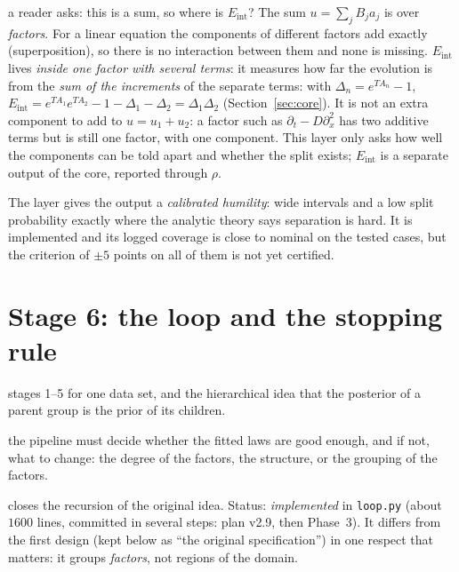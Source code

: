 \documentclass[11pt,a4paper]{article}
\theoremstyle{definition}
\newcommand{\sectionbrief}[3]{\begin{leadin}\begin{description}[nosep,leftmargin=3.0cm,labelwidth=2.8cm]
  \item[Starting from] #1
  \item[Why this section] #2
  \item[Role in the paper] #3
  \end{description}\end{leadin}}
\newcommand{\Eint}{E_{\mathrm{int}}}
\begin{document}
\begin{explained}{a reader asks: this is a sum, so where is $\Eint$?}
The sum $u=\sum_jB_ja_j$ is over \emph{factors}. For a linear equation the components of different factors add exactly (superposition), so there is no interaction between them and none is missing. $\Eint$ lives \emph{inside one factor with several terms}: it measures how far the evolution is from the \emph{sum of the increments} of the separate terms: with $\Delta_n=e^{TA_n}-1$, $\Eint=e^{TA_1}e^{TA_2}-1-\Delta_1-\Delta_2=\Delta_1\Delta_2$ (Section~\ref{sec:core}). It is not an extra component to add to $u=u_1+u_2$: a factor such as $\partial_t-D\partial_x^2$ has two additive terms but is still one factor, with one component. This layer only asks how well the components can be told apart and whether the split exists; $\Eint$ is a separate output of the core, reported through $\rho$.
\end{explained}

\begin{takeaway}
The layer gives the output a \emph{calibrated humility}: wide intervals and a low split probability exactly where the analytic theory says separation is hard. It is implemented and its logged coverage is close to nominal on the tested cases, but the criterion of $\pm5$ points on all of them is not yet certified.
\end{takeaway}



\section{Stage 6: the loop and the stopping rule}\label{sec:loop}
\sectionbrief
{stages 1--5 for one data set, and the hierarchical idea that the posterior of a parent group is the prior of its children.}
{the pipeline must decide whether the fitted laws are good enough, and if not, what to change: the degree of the factors, the structure, or the grouping of the factors.}
{closes the recursion of the original idea. Status: \emph{implemented} in \texttt{loop.py} (about $1600$ lines, committed in several steps: plan v2.9, then Phase~3). It differs from the first design (kept below as ``the original specification'') in one respect that matters: it groups \emph{factors}, not regions of the domain.}
\end{document}
